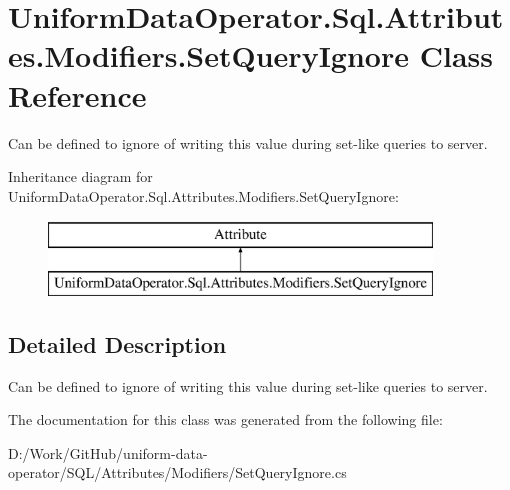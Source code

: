 \hypertarget{class_uniform_data_operator_1_1_sql_1_1_attributes_1_1_modifiers_1_1_set_query_ignore}{}\section{Uniform\+Data\+Operator.\+Sql.\+Attributes.\+Modifiers.\+Set\+Query\+Ignore Class Reference}
\label{class_uniform_data_operator_1_1_sql_1_1_attributes_1_1_modifiers_1_1_set_query_ignore}


Can be defined to ignore of writing this value during set-\/like queries to server.  


Inheritance diagram for Uniform\+Data\+Operator.\+Sql.\+Attributes.\+Modifiers.\+Set\+Query\+Ignore\+:\begin{figure}[H]
\begin{center}
\leavevmode
\includegraphics[height=2.000000cm]{db/ddc/class_uniform_data_operator_1_1_sql_1_1_attributes_1_1_modifiers_1_1_set_query_ignore}
\end{center}
\end{figure}


\subsection{Detailed Description}
Can be defined to ignore of writing this value during set-\/like queries to server. 



The documentation for this class was generated from the following file\+:\begin{DoxyCompactItemize}
\item 
D\+:/\+Work/\+Git\+Hub/uniform-\/data-\/operator/\+S\+Q\+L/\+Attributes/\+Modifiers/Set\+Query\+Ignore.\+cs\end{DoxyCompactItemize}
